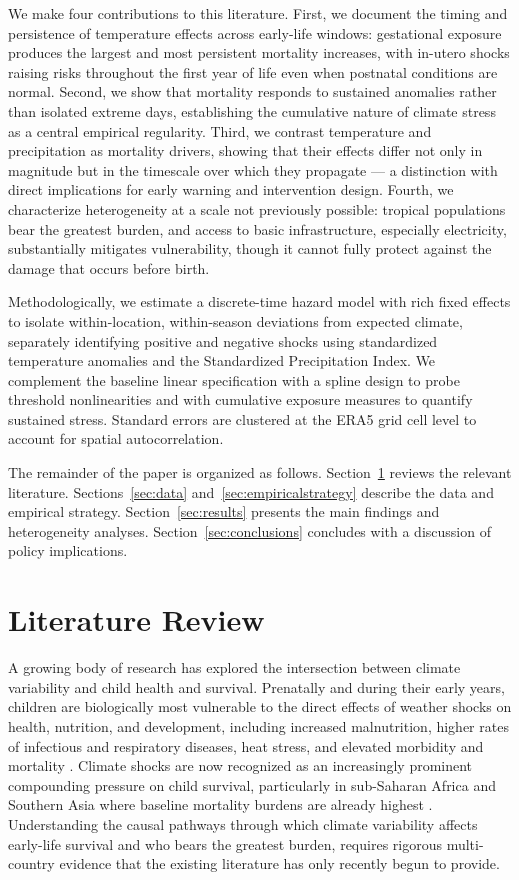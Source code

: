 \documentclass[a4paper]{article}
\begin{document}
We make four contributions to this literature. First, we document the timing and persistence of temperature effects across early-life windows: gestational exposure produces the largest and most persistent mortality increases, with in-utero shocks raising risks throughout the first year of life even when postnatal conditions are normal. Second, we show that mortality responds to sustained anomalies rather than isolated extreme days, establishing the cumulative nature of climate stress as a central empirical regularity. Third, we contrast temperature and precipitation as mortality drivers, showing that their effects differ not only in magnitude but in the timescale over which they propagate — a distinction with direct implications for early warning and intervention design. Fourth, we characterize heterogeneity at a scale not previously possible: tropical populations bear the greatest burden, and access to basic infrastructure, especially electricity, substantially mitigates vulnerability, though it cannot fully protect against the damage that occurs before birth.

Methodologically, we estimate a discrete-time hazard model with rich fixed effects to isolate within-location, within-season deviations from expected climate, separately identifying positive and negative shocks using standardized temperature anomalies and the Standardized Precipitation Index. We complement the baseline linear specification with a spline design to probe threshold nonlinearities and with cumulative exposure measures to quantify sustained stress. Standard errors are clustered at the ERA5 grid cell level to account for spatial autocorrelation.

The remainder of the paper is organized as follows. Section~\ref{sec:litreview} reviews the relevant literature. Sections~\ref{sec:data} and~\ref{sec:empiricalstrategy} describe the data and empirical strategy. Section~\ref{sec:results} presents the main findings and heterogeneity analyses. Section~\ref{sec:conclusions} concludes with a discussion of policy implications.



\section{Literature Review} \label{sec:litreview}

A growing body of research has explored the intersection between climate variability and child health and survival. Prenatally and during their early years, children are biologically most vulnerable to the direct effects of weather shocks on health, nutrition, and development, including increased malnutrition, higher rates of infectious and respiratory diseases, heat stress, and elevated morbidity and mortality \parencite{caruso2024}. Climate shocks are now recognized as an increasingly prominent compounding pressure on child survival, particularly in sub-Saharan Africa and Southern Asia where baseline mortality burdens are already highest \parencite{UNIGME2025}. Understanding the causal pathways through which climate variability affects early-life survival and who bears the greatest burden, requires rigorous multi-country evidence that the existing literature has only recently begun to provide.
\end{document}
